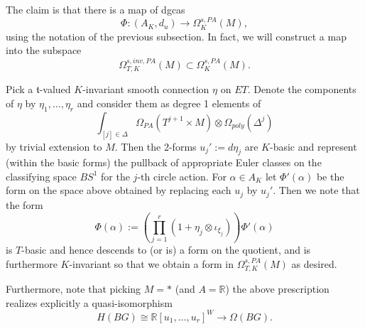 \documentclass[a4paper]{amsart}
\theoremstyle{plain}
\theoremstyle{definition}
\newtheorem{rem}[thm]{Remark}
\newcommand{\alg}[1]{\mathfrak{{#1}}}
\newcommand{\R}{{\mathbb{R}}}
\newcommand{\mF}{\mathcal{F}}
\begin{document}
The claim is that there is a map of dgcas
\begin{equation}\label{equ:Phi}
\Phi: (A_K, d_u)  \to \Omega_{K}^{s,PA}(M),
\end{equation}
using the notation of the previous subsection.
In fact, we will construct a map into the subspace
\[
 \Omega_{T,K}^{s, inv,PA}(M) \subset  \Omega_{K}^{s,PA}(M).
\]

Pick a $\alg t$-valued $K$-invariant smooth connection $\eta$ on $ET$. 
Denote the components of $\eta$ by $\eta_1,\dots, \eta_r$ and consider them as degree 1 elements of 
\[
\int_{[j] \in \Delta} \Omega_{PA}(T^{ j+1}\times M)\otimes \Omega_{poly}(\Delta^j)
\]
by trivial extension to $M$. Then the 2-forms
$u_j':=d\eta_j$ are $K$-basic and represent (within the basic forms) the pullback of appropriate Euler classes on the classifying space $BS^1$ for the $j$-th circle action. 
For $\alpha\in A_K$ let $\Phi'(\alpha)$ be the form on the space above obtained by replacing each $u_j$ by $u_j'$.
Then we note that the form
\begin{equation}\label{equ:Phipdef}
\Phi(\alpha) := \left(\prod_{j=1}^r(1+ \eta_j \otimes \iota_{\xi_{j}} ) \right) \Phi'(\alpha)
\end{equation}
is $T$-basic and hence descends to (or is) a form on the quotient, and is furthermore $K$-invariant so that we obtain a form in $\Omega_{T,K}^{s,PA}(M)$ as desired.


Furthermore, note that picking $M=*$ (and $A=\R$) the above prescription realizes explicitly a quasi-isomorphism
\begin{equation}\label{equ:HBGtoOmega}
H(BG)\cong\R[u_1,\dots, u_r]^W \to \Omega(BG).
\end{equation}


% 
\end{document}
